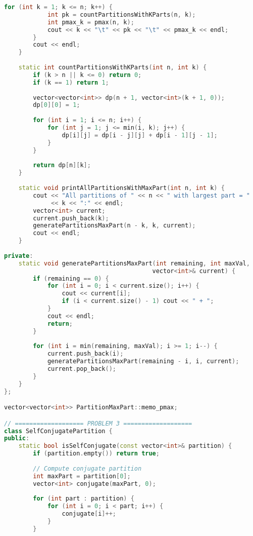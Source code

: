 \documentclass[12pt,a4paper]{article}
\theoremstyle{definition}
\begin{document}
\begin{lstlisting}[language=C++, caption=Chương trình C++ hoàn chỉnh cho bài 2 \& 3]
        for (int k = 1; k <= n; k++) {
            int pk = countPartitionsWithKParts(n, k);
            int pmax_k = pmax(n, k);
            cout << k << "\t" << pk << "\t" << pmax_k << endl;
        }
        cout << endl;
    }
    
    static int countPartitionsWithKParts(int n, int k) {
        if (k > n || k <= 0) return 0;
        if (k == 1) return 1;
        
        vector<vector<int>> dp(n + 1, vector<int>(k + 1, 0));
        dp[0][0] = 1;
        
        for (int i = 1; i <= n; i++) {
            for (int j = 1; j <= min(i, k); j++) {
                dp[i][j] = dp[i - j][j] + dp[i - 1][j - 1];
            }
        }
        
        return dp[n][k];
    }
    
    static void printAllPartitionsWithMaxPart(int n, int k) {
        cout << "All partitions of " << n << " with largest part = " 
             << k << ":" << endl;
        vector<int> current;
        current.push_back(k);
        generatePartitionsMaxPart(n - k, k, current);
        cout << endl;
    }
    
private:
    static void generatePartitionsMaxPart(int remaining, int maxVal, 
                                         vector<int>& current) {
        if (remaining == 0) {
            for (int i = 0; i < current.size(); i++) {
                cout << current[i];
                if (i < current.size() - 1) cout << " + ";
            }
            cout << endl;
            return;
        }
        
        for (int i = min(remaining, maxVal); i >= 1; i--) {
            current.push_back(i);
            generatePartitionsMaxPart(remaining - i, i, current);
            current.pop_back();
        }
    }
};

vector<vector<int>> PartitionMaxPart::memo_pmax;

// =================== PROBLEM 3 ===================
class SelfConjugatePartition {
public:
    static bool isSelfConjugate(const vector<int>& partition) {
        if (partition.empty()) return true;
        
        // Compute conjugate partition
        int maxPart = partition[0];
        vector<int> conjugate(maxPart, 0);
        
        for (int part : partition) {
            for (int i = 0; i < part; i++) {
                conjugate[i]++;
            }
        }
        

\end{lstlisting}
\end{document}
